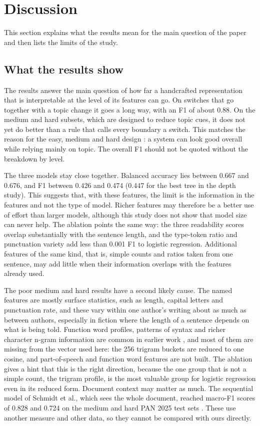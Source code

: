 \documentclass[runningheads]{llncs}
\begin{document}
\section{Discussion}
\label{sec:discussion}

This section explains what the results mean for the main question of the paper and then lists the limits of the study.

\subsection{What the results show}

The results answer the main question of how far a handcrafted representation that is interpretable at the level of its features can go. On switches that go together with a topic change it goes a long way, with an F1 of about 0.88. On the medium and hard subsets, which are designed to reduce topic cues, it does not yet do better than a rule that calls every boundary a switch. This matches the reason for the easy, medium and hard design \cite{zangerle2025overview}: a system can look good overall while relying mainly on topic. The overall F1 should not be quoted without the breakdown by level.

The three models stay close together. Balanced accuracy lies between 0.667 and 0.676, and F1 between 0.426 and 0.474 (0.447 for the best tree in the depth study). This suggests that, with these features, the limit is the information in the features and not the type of model. Richer features may therefore be a better use of effort than larger models, although this study does not show that model size can never help. The ablation points the same way: the three readability scores overlap substantially with the sentence length, and the type-token ratio and punctuation variety add less than 0.001 F1 to logistic regression. Additional features of the same kind, that is, simple counts and ratios taken from one sentence, may add little when their information overlaps with the features already used.

The poor medium and hard results have a second likely cause. The named features are mostly surface statistics, such as length, capital letters and punctuation rate, and these vary within one author's writing about as much as between authors, especially in fiction where the length of a sentence depends on what is being told. Function word profiles, patterns of syntax and richer character n-gram information are common in earlier work \cite{singh2021writing,rios2022detection}, and most of them are missing from the vector used here: the 256 trigram buckets are reduced to one cosine, and part-of-speech and function word features are not built. The ablation gives a hint that this is the right direction, because the one group that is not a simple count, the trigram profile, is the most valuable group for logistic regression even in its reduced form. Document context may matter as much. The sequential model of Schmidt et al., which sees the whole document, reached macro-F1 scores of 0.828 and 0.724 on the medium and hard PAN 2025 test sets \cite{schmidt2025team}. These use another measure and other data, so they cannot be compared with ours directly.
\end{document}
